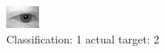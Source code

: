 \begin{figure}[h!]
\begin{center}
\includegraphics[width=0.60\columnwidth]{figures/ID427_class_1_target_2.png}
\end{center}
\caption{ Classification: 1 actual target: 2}
\label{fig:ID427_class_1_target_2}
\end{figure}

